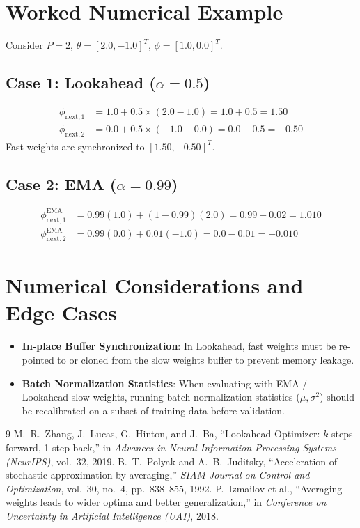 \documentclass[11pt,a4paper]{article}
\theoremstyle{definition}
\begin{document}
\section{Worked Numerical Example}

Consider $P=2$, $\theta = [2.0, -1.0]^T$, $\phi = [1.0, 0.0]^T$.

\subsection{Case 1: Lookahead ($\alpha = 0.5$)}
\begin{align}
\phi_{\text{next}, 1} &= 1.0 + 0.5 \times (2.0 - 1.0) = 1.0 + 0.5 = 1.50 \\
\phi_{\text{next}, 2} &= 0.0 + 0.5 \times (-1.0 - 0.0) = 0.0 - 0.5 = -0.50
\end{align}
Fast weights are synchronized to $[1.50, -0.50]^T$.

\subsection{Case 2: EMA ($\alpha = 0.99$)}
\begin{align}
\phi_{\text{next}, 1}^{\text{EMA}} &= 0.99(1.0) + (1 - 0.99)(2.0) = 0.99 + 0.02 = 1.010 \\
\phi_{\text{next}, 2}^{\text{EMA}} &= 0.99(0.0) + 0.01(-1.0) = 0.0 - 0.01 = -0.010
\end{align}

\section{Numerical Considerations and Edge Cases}

\begin{itemize}
    \item \textbf{In-place Buffer Synchronization}: In Lookahead, fast weights must be re-pointed to or cloned from the slow weights buffer to prevent memory leakage.
    \item \textbf{Batch Normalization Statistics}: When evaluating with EMA / Lookahead slow weights, running batch normalization statistics ($\mu, \sigma^2$) should be recalibrated on a subset of training data before validation.
\end{itemize}

\begin{thebibliography}{9}
 M.~R.~Zhang, J.~Lucas, G.~Hinton, and J.~Ba, ``Lookahead Optimizer: $k$ steps forward, 1 step back,'' in \emph{Advances in Neural Information Processing Systems (NeurIPS)}, vol.~32, 2019.
 B.~T.~Polyak and A.~B.~Juditsky, ``Acceleration of stochastic approximation by averaging,'' \emph{SIAM Journal on Control and Optimization}, vol.~30, no.~4, pp.~838--855, 1992.
 P.~Izmailov et al., ``Averaging weights leads to wider optima and better generalization,'' in \emph{Conference on Uncertainty in Artificial Intelligence (UAI)}, 2018.
\end{thebibliography}
\end{document}
